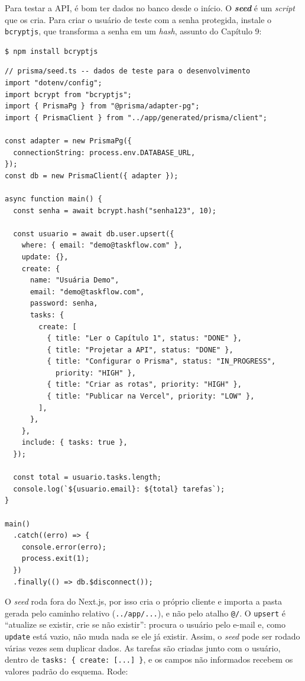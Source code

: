 Para testar a API, é bom ter dados no banco desde o início. O \textbf{\textit{seed}} é um \textit{script} que os cria. Para criar o usuário de teste com a senha protegida, instale o \texttt{bcryptjs}, que transforma a senha em um \textit{hash}, assunto do Capítulo 9:

\begin{codigo}
\begin{Verbatim}[breaklines=true, breaksymbolleft={}, fontsize=\footnotesize]
$ npm install bcryptjs
\end{Verbatim}
\end{codigo}

\begin{codigo}
\begin{Verbatim}[breaklines=true, breaksymbolleft={}, fontsize=\footnotesize]
// prisma/seed.ts -- dados de teste para o desenvolvimento
import "dotenv/config";
import bcrypt from "bcryptjs";
import { PrismaPg } from "@prisma/adapter-pg";
import { PrismaClient } from "../app/generated/prisma/client";

const adapter = new PrismaPg({
  connectionString: process.env.DATABASE_URL,
});
const db = new PrismaClient({ adapter });

async function main() {
  const senha = await bcrypt.hash("senha123", 10);

  const usuario = await db.user.upsert({
    where: { email: "demo@taskflow.com" },
    update: {},
    create: {
      name: "Usuária Demo",
      email: "demo@taskflow.com",
      password: senha,
      tasks: {
        create: [
          { title: "Ler o Capítulo 1", status: "DONE" },
          { title: "Projetar a API", status: "DONE" },
          { title: "Configurar o Prisma", status: "IN_PROGRESS",
            priority: "HIGH" },
          { title: "Criar as rotas", priority: "HIGH" },
          { title: "Publicar na Vercel", priority: "LOW" },
        ],
      },
    },
    include: { tasks: true },
  });

  const total = usuario.tasks.length;
  console.log(`${usuario.email}: ${total} tarefas`);
}

main()
  .catch((erro) => {
    console.error(erro);
    process.exit(1);
  })
  .finally(() => db.$disconnect());
\end{Verbatim}
\end{codigo}

O \textit{seed} roda fora do Next.js, por isso cria o próprio cliente e importa a pasta gerada pelo caminho relativo (\texttt{../app/...}), e não pelo atalho \texttt{@/}. O \texttt{upsert} é ``atualize se existir, crie se não existir'': procura o usuário pelo e-mail e, como \texttt{update} está vazio, não muda nada se ele já existir. Assim, o \textit{seed} pode ser rodado várias vezes sem duplicar dados. As tarefas são criadas junto com o usuário, dentro de \texttt{tasks: \{ create: [...] \}}, e os campos não informados recebem os valores padrão do esquema. Rode:

